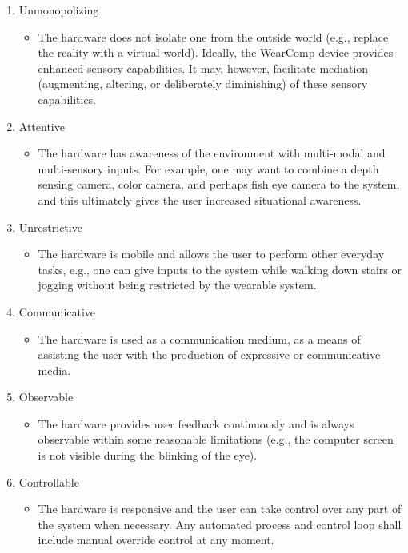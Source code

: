 \begin{enumerate}
   \item Unmonopolizing 
   \begin{itemize}
     \item The hardware does not isolate one from the outside world (e.g., replace the reality with a 
virtual world). Ideally, the WearComp device provides enhanced sensory capabilities. It may, however, 
facilitate mediation (augmenting, altering, or deliberately diminishing) of these sensory capabilities.  
   \end{itemize}
   \item Attentive
   \begin{itemize}
     \item The hardware has awareness of the environment with multi-modal and multi-sensory inputs. 
For example, one may want to combine a depth sensing camera, color camera, and perhaps fish eye 
camera to the system, and this ultimately gives the user increased situational awareness.
   \end{itemize}
   \item Unrestrictive
   \begin{itemize}
     \item The hardware is mobile and allows the user to perform other everyday tasks, e.g., one can 
give inputs to the system while walking down stairs or jogging without being restricted by the wearable 
system.
   \end{itemize}
   \item Communicative
   \begin{itemize}
     \item The hardware is used as a communication medium, as a means of assisting the user with the 
production of expressive or communicative media.
   \end{itemize}
   \item Observable
   \begin{itemize}
     \item The hardware provides user feedback continuously and is always observable within some 
reasonable limitations (e.g., the computer screen is not visible during the blinking of the eye).
   \end{itemize}
   \item Controllable
   \begin{itemize}
     \item The hardware is responsive and the user can take control over any part of the system when 
necessary. Any automated process and control loop shall include manual override control at any 
moment. 
   \end{itemize}
\end{enumerate}


